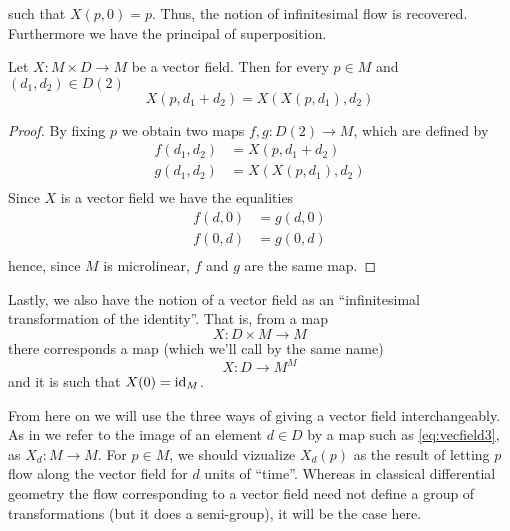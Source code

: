 such that \( X(p,0)=p \). Thus, the notion of infinitesimal flow is recovered. Furthermore we have the principal of superposition.

\begin{proposition}
Let \( X:M\times D\to M \) be a vector field. Then for every \( p\in M \) and \( (d_1,d_2)\in D(2) \)
\begin{equation*}
  X(p,d_1+d_2) = X(X(p,d_1),d_2)
\end{equation*}
\label{prop:superpos}
\end{proposition}

\begin{proof}
  By fixing \( p \) we obtain two maps \( f,g:D(2)\to M \), which are defined by
  \begin{align*}
    f(d_1,d_2) &= X(p,d_1+d_2)    \\
    g(d_1,d_2) &= X(X(p,d_1),d_2) \\
  \end{align*}
  Since \( X \) is a vector field we have the equalities
  \begin{align*}
    f(d,0) &= g(d,0) \\
    f(0,d) &= g(0,d) \\
  \end{align*}
  hence, since \( M \) is microlinear, \( f \) and \( g \) are the same map.
\end{proof}

Lastly, we also have the notion of a vector field as an ``infinitesimal transformation of the identity''. That is, from a map
\begin{equation*}
  X:D\times M\to M
\end{equation*}
there corresponds a map (which we'll call by the same name)
\begin{equation}
  X:D\to M^M
  \label{eq:vecfield3}
\end{equation}
and it is such that \( X(0)=\operatorname{id}_M \).

From here on we will use the three ways of giving a vector field interchangeably. As in \cite{lav96} we refer to the image of an element \( d\in D \) by a map such as \ref{eq:vecfield3}, as \( X_d:M\to M \). For \( p\in M \), we should vizualize \( X_d(p) \) as the result of letting \( p \) flow along the vector field for \( d \) units of ``time''. Whereas in classical differential geometry the flow corresponding to a vector field need not define a group of transformations (but it does a semi-group), it will be the case here.


